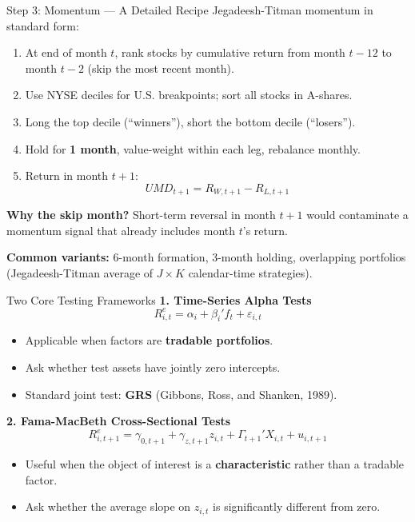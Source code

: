 \documentclass{beamer}
\begin{document}
\begin{frame}{Step 3: Momentum --- A Detailed Recipe}
	Jegadeesh-Titman momentum in standard form:
	\begin{enumerate}
		\item At end of month $t$, rank stocks by cumulative return from month $t-12$ to month $t-2$ (skip the most recent month).
		\item Use NYSE deciles for U.S. breakpoints; sort all stocks in A-shares.
		\item Long the top decile (``winners''), short the bottom decile (``losers'').
		\item Hold for \textbf{1 month}, value-weight within each leg, rebalance monthly.
		\item Return in month $t+1$:
		\begin{equation*}
			UMD_{t+1} = R_{W,t+1} - R_{L,t+1}
		\end{equation*}
	\end{enumerate}

	\textbf{Why the skip month?} Short-term reversal in month $t+1$ would contaminate a momentum signal that already includes month $t$'s return.

	\textbf{Common variants:} 6-month formation, 3-month holding, overlapping portfolios (Jegadeesh-Titman average of $J\times K$ calendar-time strategies).
\end{frame}

\begin{frame}{Two Core Testing Frameworks}
	\textbf{1. Time-Series Alpha Tests}
	\begin{equation}
		R_{i,t}^e = \alpha_i + \beta_i' f_t + \varepsilon_{i,t}
	\end{equation}
	\begin{itemize}
		\item Applicable when factors are \textbf{tradable portfolios}.
		\item Ask whether test assets have jointly zero intercepts.
		\item Standard joint test: \textbf{GRS} (Gibbons, Ross, and Shanken, 1989).
	\end{itemize}

	\vspace{0.3cm}
	\textbf{2. Fama-MacBeth Cross-Sectional Tests}
	\begin{equation}
		R_{i,t+1}^e = \gamma_{0,t+1} + \gamma_{z,t+1} z_{i,t} + \Gamma_{t+1}' X_{i,t} + u_{i,t+1}
	\end{equation}
	\begin{itemize}
		\item Useful when the object of interest is a \textbf{characteristic} rather than a tradable factor.
		\item Ask whether the average slope on $z_{i,t}$ is significantly different from zero.
	\end{itemize}
\end{frame}
\end{document}
